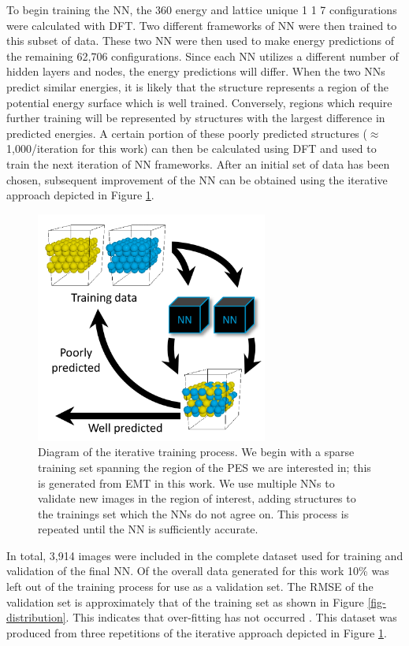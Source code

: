 \documentclass[12pt]{cmuthesis}
\begin{document}
To begin training the NN, the 360 energy and lattice unique 1 \texttimes{} 1 \texttimes{} 7 configurations were calculated with DFT. Two different frameworks of NN were then trained to this subset of data. These two NN were then used to make energy predictions of the remaining 62,706 configurations. Since each NN utilizes a different number of hidden layers and nodes, the energy predictions will differ. When the two NNs predict similar energies, it is likely that the structure represents a region of the potential energy surface which is well trained. Conversely, regions which require further training will be represented by structures with the largest difference in predicted energies. A certain portion of these poorly predicted structures (\(\approx\) 1,000/iteration for this work) can then be calculated using DFT and used to train the next iteration of NN frameworks. After an initial set of data has been chosen, subsequent improvement of the NN can be obtained using the iterative approach depicted in Figure \ref{fig-training-process}.

\begin{figure}[h]
\centering
\includegraphics[width=3in]{./images/training-process.png}
\caption{\label{fig-training-process}
Diagram of the iterative training process. We begin with a sparse training set spanning the region of the PES we are interested in; this is generated from EMT in this work. We use multiple NNs to validate new images in the region of interest, adding structures to the trainings set which the NNs do not agree on. This process is repeated until the NN is sufficiently accurate.}
\end{figure}

In total, 3,914 images were included in the complete dataset used for training and validation of the final NN. Of the overall data generated for this work 10\% was left out of the training process for use as a validation set. The RMSE of the validation set is approximately that of the training set as shown in Figure \ref{fig-distribution}. This indicates that over-fitting has not occurred \cite{behler-2015-const}. This dataset was produced from three repetitions of the iterative approach depicted in Figure \ref{fig-training-process}.
\end{document}
